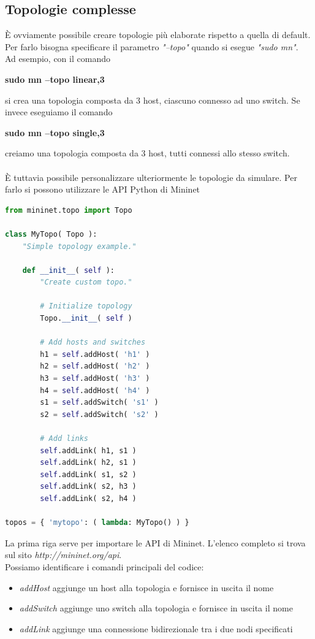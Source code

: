 \subsection{Topologie complesse}\label{ch:2.1.4}
È ovviamente possibile creare topologie più elaborate rispetto a quella di default.\\
Per farlo bisogna specificare il parametro \textit{"--topo"} quando si esegue \textit{"sudo mn"}.\\
Ad esempio, con il comando
\begin{center}
	\textbf{sudo mn --topo linear,3}
\end{center}
si crea una topologia composta da 3 host, ciascuno connesso ad uno switch. Se invece eseguiamo il comando
\begin{center}
	\textbf{sudo mn --topo single,3}
\end{center}
creiamo una topologia composta da 3 host, tutti connessi allo stesso switch.\\\\
È tuttavia possibile personalizzare ulteriormente le topologie da simulare. Per farlo si possono utilizzare le API Python di Mininet\\
\begin{lstlisting}[language=Python]
from mininet.topo import Topo

class MyTopo( Topo ):
	"Simple topology example."

	def __init__( self ):
		"Create custom topo."

		# Initialize topology
		Topo.__init__( self )

		# Add hosts and switches
		h1 = self.addHost( 'h1' )
		h2 = self.addHost( 'h2' )
		h3 = self.addHost( 'h3' )
		h4 = self.addHost( 'h4' )
		s1 = self.addSwitch( 's1' )
		s2 = self.addSwitch( 's2' )

		# Add links
		self.addLink( h1, s1 )
		self.addLink( h2, s1 )
		self.addLink( s1, s2 )
		self.addLink( s2, h3 )
		self.addLink( s2, h4 )

topos = { 'mytopo': ( lambda: MyTopo() ) }
\end{lstlisting}
La prima riga serve per importare le API di Mininet. L'elenco completo si trova sul sito \textit{http://mininet.org/api}.\\
Possiamo identificare i comandi principali del codice:
\begin{itemize}
	\item \textit{addHost} aggiunge un host alla topologia e fornisce in uscita il nome
	\item \textit{addSwitch} aggiunge uno switch alla topologia e fornisce in uscita il nome
	\item \textit{addLink} aggiunge una connessione bidirezionale tra i due nodi specificati
\end{itemize}
